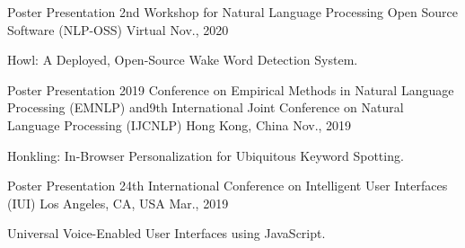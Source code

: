 \begin{cventries}
{\begin{cvitems}
\end{cvitems}
}
\cventry
{Poster Presentation} %
{2nd Workshop for Natural Language Processing Open Source Software (NLP-OSS)} %
{Virtual} %
{Nov., 2020} %
{ %
\begin{cvitems}
\item {Howl: A Deployed, Open-Source Wake Word Detection System.}
\end{cvitems}
}
\cventry
{Poster Presentation} %
{2019 Conference on Empirical Methods in Natural Language Processing (EMNLP) and\newline 9th International Joint Conference on Natural Language Processing (IJCNLP)} %
{Hong Kong, China} %
{Nov., 2019} %
{ %
\begin{cvitems}
\item {Honkling: In-Browser Personalization for Ubiquitous Keyword Spotting.}
\end{cvitems}
}
\cventry
{Poster Presentation} %
{24th International Conference on Intelligent User Interfaces (IUI)} %
{Los Angeles, CA, USA} %
{Mar., 2019} %
{ %
\begin{cvitems}
\item {Universal Voice-Enabled User Interfaces using JavaScript.}
\end{cvitems}
}
\end{cventries}

